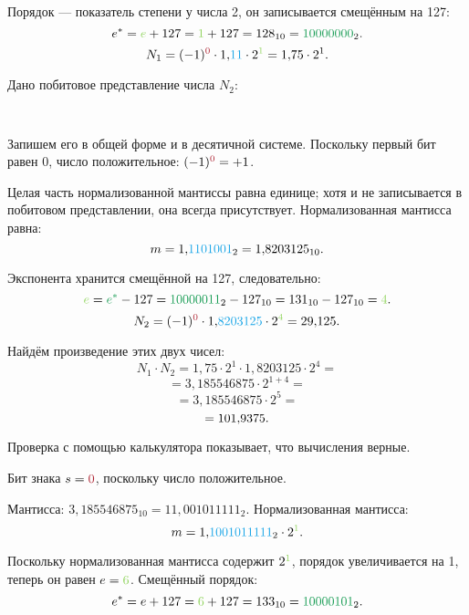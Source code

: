 \documentclass[14pt]{extarticle}
\newcommand\fp[3]{\begin{center}\vspace{-1.0em}\texttt{
        {\color{Maroon}{#1}}
        {\color{ForestGreen}{#2}}
        {\color{Cerulean}{#3}}
    }\end{center}\vspace{-0.5em}}
\begin{document}
Порядок --- показатель степени у числа 2, он записывается смещённым на 127:
$$e^*
= {\color{YellowGreen} e} + 127
= {\color{YellowGreen} 1} + 127 = 128_{10}
= {\color{ForestGreen} 10000000}_2.$$
$$N_1
= (-1)^{\color{Maroon} 0} \cdot 1{,}{\color{Cerulean}11}
\cdot 2^{{\color{YellowGreen} 1}}
= 1{,}75 \cdot 2^{1}.$$

\answer{1}{\fp{0}{10000000}{11000000000000000000000}}


Дано побитовое представление числа $N_2$:

\fp{0}{10000011}{11010010000000000000000}

Запишем его в общей форме и в десятичной системе. Поскольку первый бит равен {\color{Maroon} 0}, число положительное:
$(-1)^{\color{Maroon} 0} = +1$.

Целая часть нормализованной мантиссы равна единице; хотя и не записывается в побитовом представлении, она всегда присутствует. Нормализованная мантисса равна:
$$m = 1{,}{\color{Cerulean} 1101001}_2
= 1{,}8203125_{10}.$$

Экспонента хранится смещённой на 127, следовательно:
$$
{\color{YellowGreen} e}
= {\color{ForestGreen} e^*} - 127
= {\color{ForestGreen} 10000011}_2 - 127_{10}
= 131_{10} - 127_{10}
= {\color{YellowGreen} 4}.$$
$$N_2 = (-1)^{\color{Maroon} \answer{2a}{0}}
\cdot 1{,}{\color{Cerulean}\answer{2b}{8203125}}
\cdot 2^{\color{YellowGreen} \answer{2c}{4}}
= \answer{2}{29{,}125}.$$


Найдём произведение этих двух чисел:
$$N_1 \cdot N_2
= 1{,}75 \cdot 2^1 \cdot 1{,}8203125 \cdot 2^4 =$$
$$= 3{,}185546875 \cdot 2^{1 + 4} =$$
$$= 3{,}185546875 \cdot 2^5 =$$
$$= \answer{3a}{101{,}9375}.$$

Проверка с помощью калькулятора показывает, что вычисления верные.

Бит знака $s = {\color{Maroon} 0}$, поскольку число положительное.

Мантисса: $
3{,}185546875_{10}
= 11{,}001011111_2
$.
Нормализованная мантисса:
$$m = 1{,}{\color{Cerulean}1001011111}_2 \cdot 2^{{\color{YellowGreen} 1}}.$$

Поскольку нормализованная мантисса содержит $2^{{\color{YellowGreen} 1}}$, порядок увеличивается на 1, теперь он равен $e = {\color{YellowGreen} 6}$. Смещённый порядок:
$$e^*
= e + 127
= {\color{YellowGreen} 6} + 127
= 133_{10}
= {\color{ForestGreen} 10000101}_2.$$
\end{document}
